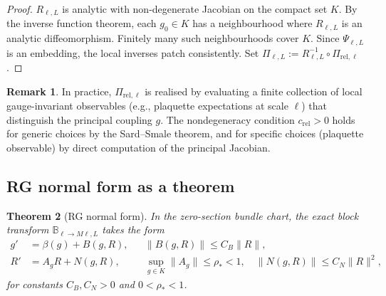\documentclass[12pt]{article}
\theoremstyle{plain}
\newtheorem{theorem}{Theorem}[section]
\theoremstyle{definition}
\newtheorem{remark}[theorem]{Remark}
\numberwithin{equation}{section}
\begin{document}
\begin{proof}
$R_{\ell,L}$ is analytic with non-degenerate Jacobian on the compact set $K$.  By the inverse function theorem, each $g_0\in K$ has a neighbourhood where $R_{\ell,L}$ is an analytic diffeomorphism.  Finitely many such neighbourhoods cover $K$.  Since $\Psi_{\ell,L}$ is an embedding, the local inverses patch consistently.  Set $\Pi_{\ell,L}:=R_{\ell,L}^{-1}\circ\Pi_{\mathrm{rel},\ell}$.
\end{proof}

\begin{remark}
In practice, $\Pi_{\mathrm{rel},\ell}$ is realised by evaluating a finite collection of local gauge-invariant observables (e.g., plaquette expectations at scale $\ell$) that distinguish the principal coupling $g$.  The nondegeneracy condition $c_{\mathrm{rel}}>0$ holds for generic choices by the Sard--Smale theorem, and for specific choices (plaquette observable) by direct computation of the principal Jacobian.
\end{remark}

\subsection{RG normal form as a theorem}

\begin{theorem}[RG normal form]\label{thm:normalform}
In the zero-section bundle chart, the exact block transform $\mathbb{B}_{\ell\to M\ell,L}$ takes the form
\begin{align}
g' &= \beta(g)+B(g,R), && \|B(g,R)\|\leq C_B\|R\|,\\
R' &= A_g R+N(g,R), && \sup_{g\in K}\|A_g\|\leq\rho_*<1,\quad \|N(g,R)\|\leq C_N\|R\|^2,
\end{align}
for constants $C_B,C_N>0$ and $0<\rho_*<1$.
\end{theorem}
\end{document}
